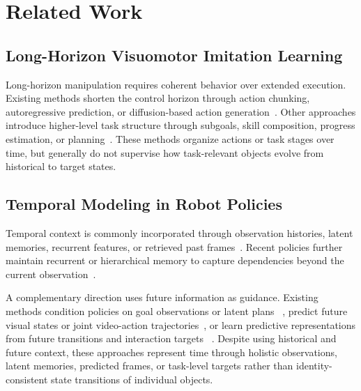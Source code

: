 \section{Related Work}
\label{sec:related_work}

\subsection{Long-Horizon Visuomotor Imitation Learning}

Long-horizon manipulation requires coherent behavior over extended execution.
Existing methods shorten the control horizon through action chunking,
autoregressive prediction, or diffusion-based
action generation~\citep{Zhao2023Learning,chi2024diffusionpolicy,
Haldar2025BAKU,reuss2024multimodal}. Other approaches introduce higher-level
task structure through subgoals, skill composition, progress estimation, or
planning~\citep{shiarlis2018taco,gupta2019relay,Chen2023Sequential,
Kang2025Incorporating,Jain2025LongerHorizon,Liu2026PALM,
Zhang2026AtomicVLA,Feng2025ReflectivePlanning,Zhou2026Act2Goal}.
These methods organize actions or task stages over time, but generally do not
supervise how task-relevant objects evolve from historical to target states.

\subsection{Temporal Modeling in Robot Policies}

Temporal context is commonly incorporated through observation histories,
latent memories, recurrent features, or retrieved past
frames~\citep{Liang2021Finite,Fang2025SAM2Act,shi2025memoryvla,
Mark2026BPP}. Recent policies further maintain recurrent or hierarchical
memory to capture dependencies beyond the current
observation~\citep{Ji2026HiMe,Xiao2026AVAVLA,Li2026OptimusVLA}.

A complementary direction uses future information as guidance.
Existing methods condition policies on goal observations or latent plans
~\citep{lynch2020play,Mandlekar2020Learning}, predict future visual states or
joint video-action trajectories~\citep{Hu2025VPP,Zhu2025UWM}, or learn
predictive representations from future transitions and interaction targets
~\citep{Zeng2024MPI}. Despite using historical and future context, these
approaches represent time through holistic observations, latent memories,
predicted frames, or task-level targets rather than identity-consistent state
transitions of individual objects.

